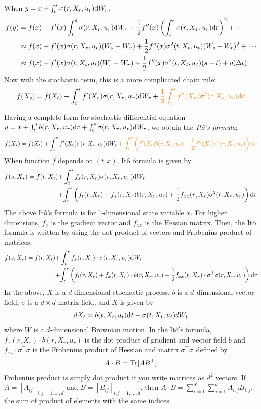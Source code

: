 \documentclass[11pt]{book}
\newcommand{\dt}{\text{\normalfont d}t}
\newcommand{\dr}{\text{\normalfont d}r}
\newcommand{\dW}{\text{\normalfont d}W}
\begin{document}
When $y=x+\int_t^s \sigma(r,X_r,u_r)\dW_r$, 
\[
\begin{split}
f(y)& = f(x) + f^{\prime}(x)\int_t^s \sigma(r,X_r,u_r)\dW_r + \frac12f^{\prime\prime}(x) \left(\int_t^s \sigma(r,X_r,u_r)\dr\right)^2 + \cdots\\
& \approx f(x) + f^{\prime}(x) \sigma(r,X_r,u_r)(W_s-W_r) + \frac12f^{\prime\prime}(x) \sigma^2(t,X_t,u_t)(W_s-W_r)^2 + \cdots\\
& \approx f(x) + f^{\prime}(x) \sigma(t,X_t,u_t)(W_s-W_r) + \frac12 f^{\prime\prime}(x)\sigma^2(t,X_t,u_t)(s-t)+o(\Delta t)
\end{split}
\]
Now with the stochastic term, this is a more complicated chain rule:
\[
f(X_s)=f(X_t)+\int_t^s f^\prime(X_r)\sigma(r,X_r,u_r)\dW_r + {\color{orange}\frac12\int_t^s f^{\prime\prime}(X_r)\sigma^2(r,X_r,u_r)\dr}
\]

Having a complete form for stochastic differential equation $y=x+\int_t^s b(r,X_r,u_r)\dr+\int_t^s \sigma(r,X_r,u_r)\dW_r$, we obtain the \emph{Itô's formula};
\[
f(X_s)=f(X_t)+\int_t^s f^\prime(X_r)\sigma(r,X_r,u_r)\dW_r + {\color{orange}\int_t^s \left(f^\prime(X_r)b(r,X_r,u_r)+\frac12f^{\prime\prime}(X_r)\sigma^2(r,X_r,u_r)\right)\dr}
\]
When function $f$ depends on $(t,x)$, 
Itô formula is given by
\[
\begin{split}
    f(s,X_s)=f(t,X_t)+&\int_t^s f_x(r,X_r)\sigma(r,X_r,u_r)\dW_r\\
    +& {\int_t^s \left(f_t(r,X_r)+f_x(r,X_r)b(r,X_r,u_r)+\frac12f_{xx}(r,X_r)\sigma^2(r,X_r,u_r)\right)\dr}
\end{split}
\]
The above Itô's formula is for 1-dimensional state variable $x$. For higher dimensions, $f_x$ is the gradient vector and $f_{xx}$ is the Hessian matrix. Then, the Itô formula is written by using the dot product of vectors and Frobenius product of matrices.
\[
\begin{split}
    f(s,X_s)=f(t,X_t)+&\int_t^s f_x(r,X_r)\cdot \sigma(r,X_r,u_r)\dW_r\\
    +& {\int_t^s \left(f_t(r,X_r)+f_x(r,X_r)\cdot b(r,X_r,u_r)+\frac12f_{xx}(r,X_r)\cdot\sigma^{\top}\sigma(r,X_r,u_r)\right)\dr}
\end{split}
\]
In the above, $X$ is a $d$-dimensional stochastic process, $b$ is a $d$-dimensional vector field, $\sigma$ is a $d\times d$ matrix field, and $X$ is given by
\[
dX_t = b(t,X_t,u_t)\dt +\sigma(t,X_t,u_t)dW_t
\]
where $W$ is a $d$-dimensional Brownian motion. 
In the Itô's formula, $f_x(r,X_r)\cdot b(r,X_r,u_r)$ is the dot product of gradient and vector field $b$ and $f_{xx}\cdot\sigma^{\top}\sigma$ is the Frobenius product of Hessian  and matrix $\sigma^{\top}\sigma$ defined by 
\[
A\cdot B = \text{\normalfont Tr}[AB^\top]
\]
Frobenius product is simply dot product if you write matrices as $d^2$ vectors. If $A=[A_{ij}]_{i,j=1,...,d}$ and $B=[B_{ij}]_{i,j=1,...,d}$, then 
$A\cdot B = \sum_{i=1}^d\sum_{j=1}^d A_{i,j}B_{i,j}$, the sum of product of elements with the same indices.
\end{document}
